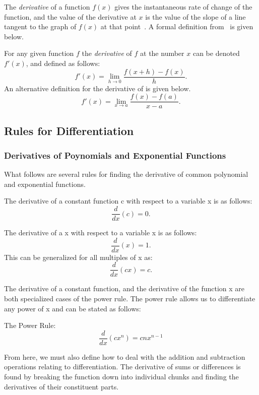 The \emph{derivative} of a function $f(x)$ gives the instantaneous rate of change of the function, and the value of the derivative at $x$ is the value of the slope of a line tangent to the graph of $f(x)$ at that point~\cite{Saxon}.  A formal definition from~\cite{Johnson} is given below. 

\begin{definition}  For any given function $f$ the \emph{derivative} of $f$ at the number $x$ can be denoted $f'(x)$, and defined as follows: $$f'(x) = \lim_{h\to0} \dfrac{f(x + h) - f(x)}{h}.$$  An alternative definition for the derivative of is given below.  $$f'(x) = \lim_{x\to{a}} \dfrac{f(x) - f(a)}{x - a}.$$
\end{definition}

\subsection{Rules for Differentiation}     
\subsubsection{Derivatives of Poynomials and Exponential Functions}
What follows are several rules for finding the derivative of common polynomial and exponential functions.

\begin{theorem} The derivative of a constant function c with respect to a variable x is as follows: $$ \dfrac{d}{dx}(c) = 0. $$ 
\end{theorem}

\begin{theorem} The derivative of a x with respect to a variable x is as follows: $$ \dfrac{d}{dx}(x) = 1. $$ This can be generalized for all multiples of x as: $$ \dfrac{d}{dx}(cx) = c. $$ 
\end{theorem}

The derivative of a constant function, and the derivative of the function x are both specialized cases of the power rule. The power rule allows us to differentiate any power of x and can be stated as follows: 
\begin{theorem} The Power Rule: $$\dfrac{d}{dx}(cx^n) = cnx^{n-1}$$

\end{theorem}

From here, we must also define how to deal with the addition and subtraction operations relating to differentiation. The derivative of sums or differences is found by breaking the function down into individual chunks and finding the derivatives of their constituent parts.

